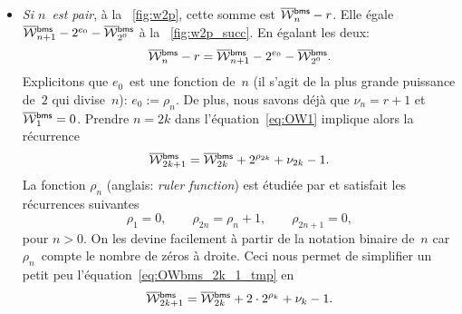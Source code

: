 \begin{itemize}

  \item \emph{Si \(n\)~est pair}, à la \fig~\vref{fig:w2p}, cette somme
  est \(\OW{\fun{bms}}{n} - r\). Elle
  égale \(\OW{\fun{bms}}{n+1} - 2^{e_0} - \OW{\fun{bms}}{2^0}\) à la
  \fig~\vref{fig:w2p_succ}. En égalant les deux:
  \begin{equation}
    \OW{\fun{bms}}{n} - r = \OW{\fun{bms}}{n+1} - 2^{e_0} -
    \OW{\fun{bms}}{2^0}.
      \label{eq:OW1}
  \end{equation}
  Explicitons que \(e_0\)~est une fonction de~\(n\) (il s'agit de la
  plus grande puissance de~\(2\) qui divise~\(n\)): \(e_0 :=
  \rho_n\). De plus, nous savons déjà que \(\nu_n = r+1\) et
  \(\OW{\fun{bms}}{1} = 0\). Prendre \(n=2k\) dans
  l'équation~\eqref{eq:OW1} implique alors la récurrence
    \begin{equation}
      \OW{\fun{bms}}{2k+1} = \OW{\fun{bms}}{2k} + 2^{\rho_{2k}} +
      \nu_{2k} - 1.
      \label{eq:OWbms_2k_1_tmp}
    \end{equation}
    La fonction \(\rho_n\) (anglais: \emph{ruler function}) est
    étudiée par \cite{GrahamKnuthPatashnik_1994,Knuth_2011}
     et satisfait les récurrences suivantes
    \begin{equation}
      \rho_{1} = 0,\qquad \rho_{2n} = \rho_{n} + 1,\qquad
      \rho_{2n+1} = 0,\label{eq:ruler}
    \end{equation}
    pour \(n>0\). On les devine facilement à partir de la notation
    binaire de~\(n\) car \(\rho_n\)~compte le nombre de zéros à
    droite. Ceci nous permet de simplifier un petit peu
    l'équation~\eqref{eq:OWbms_2k_1_tmp} en
    \begin{equation}
     \OW{\fun{bms}}{2k+1} = \OW{\fun{bms}}{2k} + 2 \cdot 2^{\rho_{k}}
     + \nu_{k} - 1.
     \label{eq:OWbms_2k_1}
    \end{equation}


\end{itemize}
